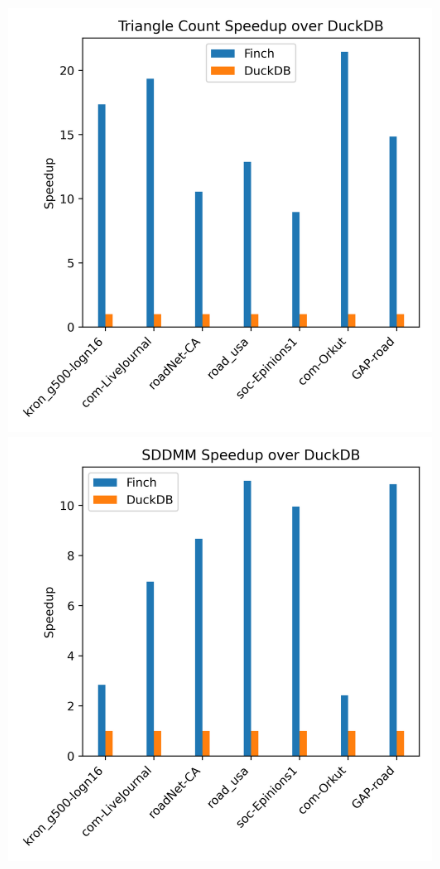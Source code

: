 \begin{figure}
  \centering %
  \begin{minipage}[t]{0.32\linewidth}
    \vspace{0pt}
    \centering
    \includegraphics[width=\linewidth]{figures/triangle_count_speedup_over_duckdb.png}
    \vspace{0pt}
  \end{minipage}%
  \begin{minipage}[t]{0.32\linewidth}
    \vspace{0pt}
    \centering
    \includegraphics[width=\linewidth]{figures/sddmm_speedup_over_duckdb.png}

\end{minipage}
\end{figure}
